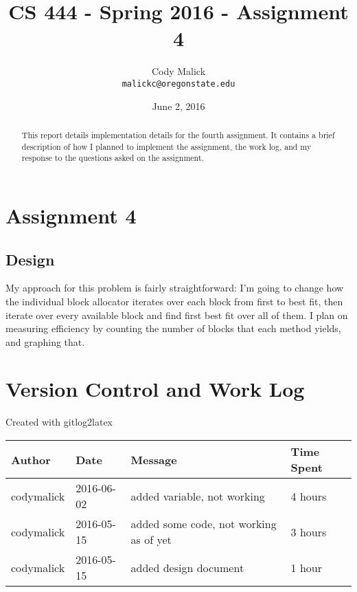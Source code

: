 \documentclass[10pt,letterpaper,onecolumn,draftclsnofoot]{IEEEtran}
\begin{document}
\begin{titlepage}
  \title{CS 444 - Spring 2016 - Assignment 4}
  \author{Cody Malick\\
  \texttt{malickc@oregonstate.edu}}
  \date{June 2, 2016}
  \maketitle
  \vspace*{2cm}
  \begin{abstract}
      \noindent This report details implementation details for the fourth assignment.
      It contains a brief description of how I planned to implement the assignment,
      the work log, and my response to the questions asked on the assignment. \end{abstract}

\end{titlepage}

\tableofcontents
\clearpage

\section{Assignment 4}
  \subsection{Design}
	My approach for this problem is fairly straightforward: I'm going to change
	how the individual block allocator iterates over each block from first to
	best fit, then iterate over every available block and find first best fit
	over all of them. I plan on measuring efficiency by counting the number of
	blocks that each method yields, and graphing that.

	\section{Version Control and Work Log}
	Created with gitlog2latex
	\begin{center}
		\begin{longtabu} to \textwidth {|
		    X[4,l]|
		    X[3,c]|
		    X[8,l]|
		    X[4,1]|}
		    \hline
		    \textbf{Author} & \textbf{Date} & \textbf{Message} & \textbf{Time Spent} \\ \hline
		codymalick & 2016-06-02 & added variable, not working & 4 hours \\ \hline
		codymalick & 2016-05-15 & added some code, not working as of yet & 3 hours \\ \hline
		codymalick & 2016-05-15 & added design document & 1 hour \\ \hline
	\end{longtabu}
	\end{center}
\end{document}
